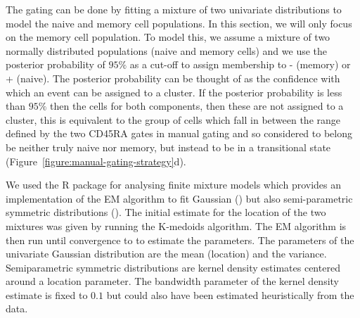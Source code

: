 The  gating can be done by fitting a mixture of two univariate distributions to model the naive and memory cell populations.
In this section, we will only focus on the memory cell population.
To model this, we assume a mixture of two normally distributed populations (naive and memory cells) and we use the posterior probability of $95\%$ as
a cut-off to assign membership to - (memory) or + (naive).
The posterior probability can be thought of as the confidence with which an event can be assigned to a cluster.
If the posterior probability is less than $95\%$ then the cells for both components, then these are not assigned to a cluster,
this is equivalent to the group of cells which fall in between the range defined by
the two CD45RA gates in manual gating and so considered to belong be neither truly naive nor memory,
but instead to be in a transitional state (Figure~\ref{figure:manual-gating-strategy}d).

We used the  R package for analysing finite mixture models which provides an implementation of the EM algorithm \citep{Dempster:1977ul}
to fit Gaussian () but also semi-parametric symmetric distributions ().
The initial estimate for the location of the two mixtures was given by running the K-medoids algorithm.
The EM algorithm is then run until convergence to to estimate the parameters.
The parameters of the univariate Gaussian distribution are the mean (location) and the variance.
Semiparametric symmetric distributions are kernel density estimates centered around a location parameter.
The bandwidth parameter of the kernel density estimate is fixed to $0.1$ but could also have been estimated heuristically from the data.

